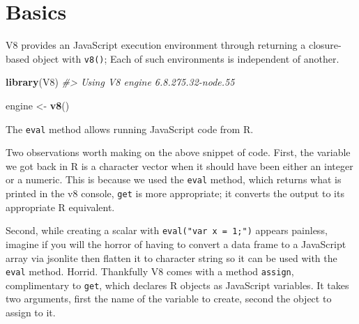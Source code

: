 \documentclass[
  10pt,
]{krantz}
\makeatletter
\newenvironment{Shaded}{\begin{snugshade}}{\end{snugshade}}
\newcommand{\CommentTok}[1]{\textcolor[rgb]{0.37,0.37,0.37}{\textit{#1}}}
\newcommand{\KeywordTok}[1]{\textcolor[rgb]{0.27,0.27,0.27}{\textbf{#1}}}
\newcommand{\NormalTok}[1]{#1}
\newcommand{\OperatorTok}[1]{\textcolor[rgb]{0.43,0.43,0.43}{\textbf{#1}}}
\newcommand{\StringTok}[1]{\textcolor[rgb]{0.5,0.5,0.5}{#1}}
\newenvironment{kframe}{%
\medskip{}
\setlength{\fboxsep}{.8em}
 \def\at@end@of@kframe{}%
 \ifinner\ifhmode%
  \def\at@end@of@kframe{\end{minipage}}%
  \begin{minipage}{\columnwidth}%
 \fi\fi%
 \def\FrameCommand##1{\hskip\@totalleftmargin \hskip-\fboxsep
 \colorbox{shadecolor}{##1}\hskip-\fboxsep
     \hskip-\linewidth \hskip-\@totalleftmargin \hskip\columnwidth}%
 \MakeFramed {\advance\hsize-\width
   \@totalleftmargin\z@ \linewidth\hsize
   \@setminipage}}%
 {\par\unskip\endMakeFramed%
 \at@end@of@kframe}
\renewenvironment{Shaded}{\begin{kframe}}{\end{kframe}}
\makeatother
\begin{document}
\hypertarget{v8-basics}{%
\section{Basics}\label{v8-basics}}

V8 provides an JavaScript execution environment through returning a closure-based object with \texttt{v8()}; Each of such environments is independent of another.

\begin{Shaded}
\begin{Highlighting}[]
\KeywordTok{library}\NormalTok{(V8)}
\CommentTok{\#> Using V8 engine 6.8.275.32{-}node.55}

\NormalTok{engine <{-}}\StringTok{ }\KeywordTok{v8}\NormalTok{()}
\end{Highlighting}
\end{Shaded}

The \texttt{eval} method allows running JavaScript code from R.

\begin{Shaded}
\end{Shaded}

Two observations worth making on the above snippet of code. First, the variable we got back in R is a character vector when it should have been either an integer or a numeric. This is because we used the \texttt{eval} method, which returns what is printed in the v8 console, \texttt{get} is more appropriate; it converts the output to its appropriate R equivalent.

\begin{Shaded}
\end{Shaded}

Second, while creating a scalar with \texttt{eval("var\ x\ =\ 1;")} appears painless, imagine if you will the horror of having to convert a data frame to a JavaScript array via jsonlite then flatten it to character string so it can be used with the \texttt{eval} method. Horrid. Thankfully V8 comes with a method \texttt{assign}, complimentary to \texttt{get}, which declares R objects as JavaScript variables. It takes two arguments, first the name of the variable to create, second the object to assign to it.
\end{document}
